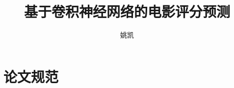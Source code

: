\documentclass[bachelor]{ustcthesis}
\title{基于卷积神经网络的电影评分预测}
\author{姚凯}
\begin{document}
\maketitle

%
%
%

\frontmatter

\tableofcontents
\listoffigures
\listoftables
\listofalgorithms  %
% 

\mainmatter










\appendix
\chapter{论文规范}

\backmatter


\end{document}

